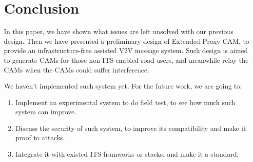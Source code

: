 \section{Conclusion} \label{sec:conclusion}

In this paper, we have shown what issues are left unsolved with our previous design.
Then we have presented a preliminary design of Extended Proxy CAM,
to provide an infrastructure-free assisted V2V message system.
Such design is aimed to generate CAMs for those non-ITS enabled road users,
and meanwhile relay the CAMs when the CAMs could suffer interference.

We haven't implemented such system yet. For the future work, we are going to:
\begin{enumerate}
\item Implement an experimental system to do field test, to see how much such system can improve.
\item Discuss the security of such system, to improve its compatibility and make it proof to attacks.
\item Integrate it with existed ITS framworks or stacks, and make it a standard.
\end{enumerate}